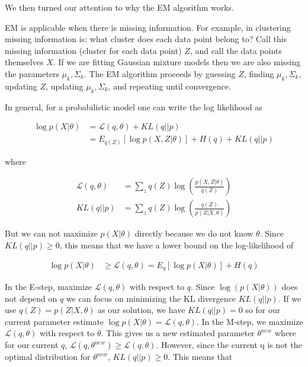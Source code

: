 \documentclass[11pt]{article}
\begin{document}
We then turned our attention to why the EM algorithm works.  

EM is applicable when there is missing information.  For example, in clustering missing information is: what cluster does each data point belong to?  Call this missing information (cluster for each data point) $Z$, and call the data points themselves $X$.  If we are fitting Gaussian mixture models then we are also missing the parameters ${\mu_k}, {\Sigma_k}$.  The EM algorithm proceeds by guessing $Z$, finding $\mu_k, \Sigma_k$, updating $Z$, updating $\mu_k, \Sigma_k$, and repeating until convergence.

In general, for a probabilistic model one can write the log likelihood as

\begin{align*}
\log p(X|\theta) &= \mathcal{L}(q,\theta) + KL(q||p) \\
                           &= E_{q(Z)}[\log p(X,Z|\theta)] + H(q) + KL(q||p)
\end{align*}

where

\begin{align*}
\mathcal{L}(q,\theta) &= \sum_{z}{q(Z)\log(\frac{p(X,Z|\theta)}{q(Z)})} \\
KL(q||p) &= \sum_{z}{q(Z)\log(\frac{q(Z)}{p(Z|X,\theta)})}
\end{align*}

But we can not maximize $p(X|\theta)$ directly because we do not know $\theta$.  Since $ KL(q||p) \geq 0$, this means that we have a lower bound on the log-likelihood of

\begin{align*}
\log p(X|\theta) &\geq \mathcal{L}(q,\theta) = E_{q}[\log p(X|\theta)] + H(q)
\end{align*}

In the E-step, maximize $\mathcal{L}(q,\theta)$ with respect to $q$.  Since $\log(p(X|\theta))$ does not depend on $q$ we can focus on minimizing the KL divergence $KL(q||p)$. If we use $q(Z) = p(Z|X,\theta)$ as our solution, we have $KL(q||p) = 0$ so for our current parameter estimate $\log p(X|\theta) = \mathcal{L}(q,\theta)$. In the M-step, we maximize $\mathcal{L}(q,\theta)$ with respect to $\theta$. This gives us a new estimated parameter $\theta^{new}$ where for our current $q$, $\mathcal{L}(q,\theta^{new}) \geq \mathcal{L}(q,\theta)$.  However, since the current q is not the optimal distribution for $\theta^{new}$, $KL(q||p) \geq 0$. This means that 
\end{document}
